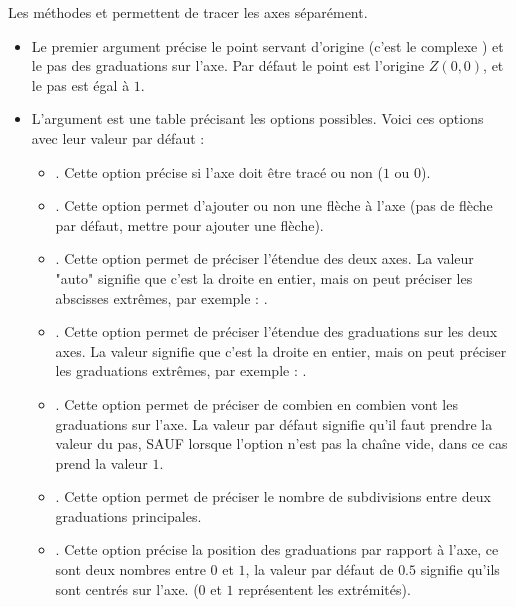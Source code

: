 Les méthodes  et  permettent de tracer les axes séparément.
\begin{itemize}
    \item Le premier argument précise le point servant d'origine (c'est le complexe ) et le pas des graduations sur l'axe. Par défaut le point  est l'origine $Z(0,0)$, et le pas est égal à $1$.
    \item L'argument  est une table précisant les options possibles. Voici ces options avec leur valeur par défaut :
        \begin{itemize}
            \item {}. Cette option précise si l'axe doit être tracé ou non ($1$ ou $0$).
            
            \item {}. Cette option permet d'ajouter ou non une flèche à l'axe (pas de flèche par défaut, mettre  pour ajouter une flèche).
            
            \item {}. Cette option permet de préciser l'étendue des deux axes. La valeur "auto" signifie que c'est la droite en entier, mais on peut préciser les abscisses extrêmes, par exemple : .
            
            \item {}. Cette option permet de préciser l'étendue des graduations sur les deux axes. La valeur  signifie que c'est la droite en entier, mais on peut préciser les graduations extrêmes, par exemple : .
            \item {}. Cette option permet de préciser de combien en combien vont les graduations sur l'axe. La valeur par défaut signifie qu'il faut prendre la valeur du pas, SAUF lorsque l'option  n'est pas la chaîne vide, dans ce cas  prend la valeur $1$.
            
            \item {}. Cette option permet de préciser le nombre de subdivisions entre deux graduations principales.
            
            \item {}. Cette option précise la position des graduations par rapport à l'axe, ce sont deux nombres entre $0$ et $1$, la valeur par défaut de $0.5$ signifie qu'ils sont centrés sur l'axe. ($0$ et $1$ représentent les extrémités).
            

\end{itemize}
\end{itemize}
